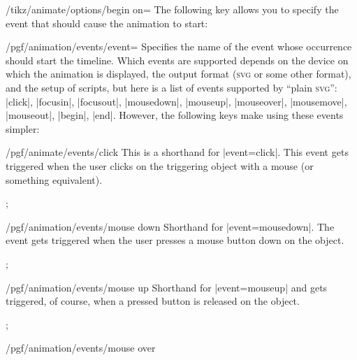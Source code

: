 \begin{key}{/tikz/animate/options/begin on=}
  The following key allows you to specify the event that should cause
  the animation to start:
  \begin{key}{/pgf/animation/events/event=}
    Specifies the name of the event whose occurrence should start the
    timeline. Which events are supported depends on the device on
    which the animation is displayed, the output format
    (\textsc{svg} or some other format), and the setup of scripts, but
    here is a list of events supported by ``plain \textsc{svg}'':
    |click|, |focusin|, |focusout|, |mousedown|,  |mouseup|,
    |mouseover|, |mousemove|, |mouseout|, |begin|, |end|. However, the
    following keys make using these events simpler:
    \begin{key}{/pgf/animate/events/click}
      This is a shorthand for |event=click|. This event gets triggered
      when the user clicks on the triggering object with a mouse (or
      something equivalent).
\begin{codeexample}[width=2cm]
\tikz 
  ; 
\end{codeexample}
    \end{key}
    \begin{key}{/pgf/animation/events/mouse down}
      Shorthand for |event=mousedown|. The event gets
      triggered when the user presses a mouse button down on the object.
\begin{codeexample}[width=2cm]
\tikz 
  ; 
\end{codeexample}
    \end{key}
    \begin{key}{/pgf/animation/events/mouse up}
      Shorthand for |event=mouseup| and gets triggered, of course,
      when a pressed button is released on the object.
\begin{codeexample}[width=2cm]
\tikz 
  ; 
\end{codeexample}
    \end{key}
    \begin{key}{/pgf/animation/events/mouse over}

\end{key}
\end{key}
\end{key}
